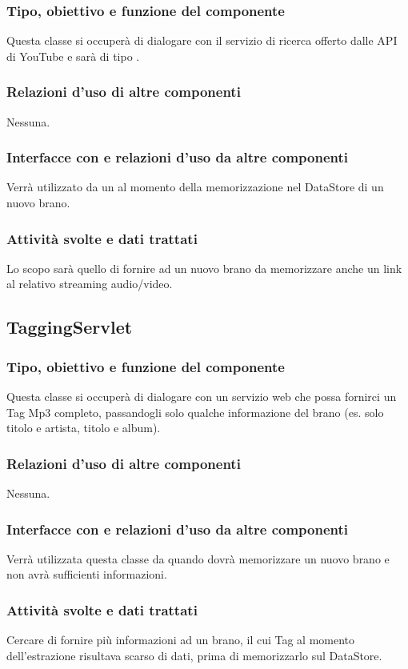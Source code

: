 \subsubsection*{Tipo, obiettivo e funzione del componente}
Questa classe si occuper\`a di dialogare con il servizio di ricerca offerto
dalle API di YouTube e sar\`a di tipo .
\subsubsection*{Relazioni d'uso di altre componenti}
Nessuna.
\subsubsection*{Interfacce con e relazioni d'uso da altre componenti}
Verr\`a utilizzato da un  al momento della memorizzazione nel
DataStore di un nuovo brano.
\subsubsection*{Attivit\`a svolte e dati trattati}
Lo scopo sar\`a quello di fornire ad un nuovo brano
da memorizzare anche un link al relativo streaming audio/video.

\subsection{TaggingServlet} %
\subsubsection*{Tipo, obiettivo e funzione del componente}
Questa classe si occuper\`a di dialogare con un servizio web che possa fornirci
un Tag Mp3 completo, passandogli solo qualche informazione del brano (es.
solo titolo e artista, titolo e album).
\subsubsection*{Relazioni d'uso di altre componenti}
Nessuna.
\subsubsection*{Interfacce con e relazioni d'uso da altre componenti}
Verr\`a utilizzata questa classe da  quando dovr\`a memorizzare
un nuovo brano e non avr\`a sufficienti informazioni.
\subsubsection*{Attivit\`a svolte e dati trattati}
Cercare di fornire pi\`u informazioni ad un brano, il cui Tag al momento
dell'estrazione risultava scarso di dati, prima di memorizzarlo sul
DataStore.

